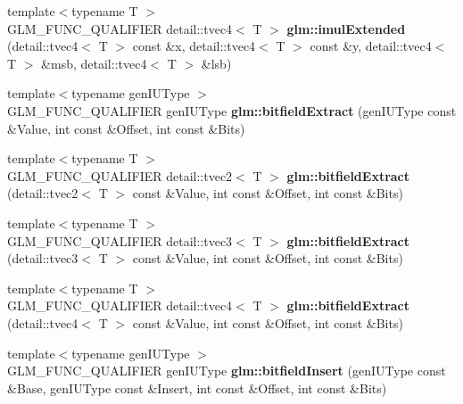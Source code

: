 \begin{DoxyCompactItemize}
\item 
\hypertarget{namespaceglm_ae71642a7ba52d6fa07a85c42bd53490b}{{\footnotesize template$<$typename T $>$ }\\\-G\-L\-M\-\_\-\-F\-U\-N\-C\-\_\-\-Q\-U\-A\-L\-I\-F\-I\-E\-R \*
detail\-::tvec4$<$ \-T $>$ {\bfseries glm\-::imul\-Extended} (detail\-::tvec4$<$ \-T $>$ const \&x, detail\-::tvec4$<$ \-T $>$ const \&y, detail\-::tvec4$<$ \-T $>$ \&msb, detail\-::tvec4$<$ \-T $>$ \&lsb)}\label{namespaceglm_ae71642a7ba52d6fa07a85c42bd53490b}

\item 
\hypertarget{namespaceglm_ab906f9d74a7ecfe5a3ad9901f8808145}{{\footnotesize template$<$typename gen\-I\-U\-Type $>$ }\\\-G\-L\-M\-\_\-\-F\-U\-N\-C\-\_\-\-Q\-U\-A\-L\-I\-F\-I\-E\-R gen\-I\-U\-Type {\bfseries glm\-::bitfield\-Extract} (gen\-I\-U\-Type const \&\-Value, int const \&\-Offset, int const \&\-Bits)}\label{namespaceglm_ab906f9d74a7ecfe5a3ad9901f8808145}

\item 
\hypertarget{namespaceglm_a62e1ddc745fb24a1aab7a76a2ffd3a33}{{\footnotesize template$<$typename T $>$ }\\\-G\-L\-M\-\_\-\-F\-U\-N\-C\-\_\-\-Q\-U\-A\-L\-I\-F\-I\-E\-R \*
detail\-::tvec2$<$ \-T $>$ {\bfseries glm\-::bitfield\-Extract} (detail\-::tvec2$<$ \-T $>$ const \&\-Value, int const \&\-Offset, int const \&\-Bits)}\label{namespaceglm_a62e1ddc745fb24a1aab7a76a2ffd3a33}

\item 
\hypertarget{namespaceglm_ab98cc1758f2f503a01d7e501130cd65f}{{\footnotesize template$<$typename T $>$ }\\\-G\-L\-M\-\_\-\-F\-U\-N\-C\-\_\-\-Q\-U\-A\-L\-I\-F\-I\-E\-R \*
detail\-::tvec3$<$ \-T $>$ {\bfseries glm\-::bitfield\-Extract} (detail\-::tvec3$<$ \-T $>$ const \&\-Value, int const \&\-Offset, int const \&\-Bits)}\label{namespaceglm_ab98cc1758f2f503a01d7e501130cd65f}

\item 
\hypertarget{namespaceglm_a63dec2549abeb2193447b216e8f06158}{{\footnotesize template$<$typename T $>$ }\\\-G\-L\-M\-\_\-\-F\-U\-N\-C\-\_\-\-Q\-U\-A\-L\-I\-F\-I\-E\-R \*
detail\-::tvec4$<$ \-T $>$ {\bfseries glm\-::bitfield\-Extract} (detail\-::tvec4$<$ \-T $>$ const \&\-Value, int const \&\-Offset, int const \&\-Bits)}\label{namespaceglm_a63dec2549abeb2193447b216e8f06158}

\item 
\hypertarget{namespaceglm_a7d1ed8999168d06ceef64fc672f25690}{{\footnotesize template$<$typename gen\-I\-U\-Type $>$ }\\\-G\-L\-M\-\_\-\-F\-U\-N\-C\-\_\-\-Q\-U\-A\-L\-I\-F\-I\-E\-R gen\-I\-U\-Type {\bfseries glm\-::bitfield\-Insert} (gen\-I\-U\-Type const \&\-Base, gen\-I\-U\-Type const \&\-Insert, int const \&\-Offset, int const \&\-Bits)}\label{namespaceglm_a7d1ed8999168d06ceef64fc672f25690}


\end{DoxyCompactItemize}
